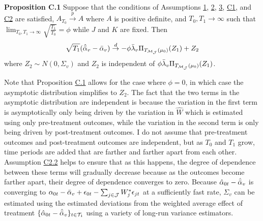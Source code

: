 \documentclass{article}
\begin{document}
\textbf{Proposition C.1} \label{PC1} Suppose that the conditions of Assumptions \hyperref[A1]{1}, \hyperref[A2]{2}, \hyperref[A3]{3}, \hyperref[AC1]{C1}, and \hyperref[AC2]{C2} are satisfied, $A_{T_0} \overset{p}{\rightarrow} A$ where $A$ is positive definite, and $T_0, T_1\rightarrow \infty$ such that $\lim_{T_0,T_1 \rightarrow \infty} \sqrt{\frac{T_1}{T_0}} = \phi$ while $J$ and $K$ are fixed. Then
\begin{equation*} 
    \sqrt{T_1}(\hat{\Bar{\alpha}}_v - \Bar{\alpha}_v) \overset{d}{\rightarrow} - \phi \Bar{\lambda}_v \Pi_{T_{\mathcal{M}_{\mathcal{J}}}(\mu_0)}(Z_1) + Z_2
\end{equation*}
where $Z_2 \sim N(0, \Sigma_v)$ and $Z_2$ is independent of $ \phi \Bar{\lambda}_v \Pi_{T_{\mathcal{M}_{\mathcal{J}}}(\mu_0)}(Z_1)$.
\par 
Note that Proposition \hyperref[PC1]{C.1} allows for the case where $\phi = 0$, in which case the asymptotic distribution simplifies to $Z_2$. The fact that the two terms in the asymptotic distribution are independent is because the variation in the first term is asymptotically only being driven by the variation in $\hat{W}$ which is estimated using only pre-treatment outcomes, while the variation in the second term is only being driven by post-treatment outcomes. I do not assume that pre-treatment outcomes and post-treatment outcomes are independent, but as $T_0$ and $T_1$ grow, time periods are added that are farther and farther apart from each other. Assumption \hyperref[AC2]{C2.2} helps to ensure that as this happens, the degree of dependence between these terms will gradually decrease because as the outcomes become farther apart, their degree of dependence converges to zero. Because $\hat{\alpha}_{0t} - \hat{\Bar{\alpha}}_v$ is converging to $\alpha_{0t} - \Bar{\alpha}_v + \epsilon_{0t} - \sum_{j \in \mathcal{J}}W^*_j \epsilon_{jt}$ at a sufficiently fast rate, $\Sigma_v$ can be estimated using the estimated deviations from the weighted average effect of treatment $\{\hat{\alpha}_{0t} - \hat{\Bar{\alpha}}_v\}_{t \in \mathcal{T}_1}$ using a variety of long-run variance estimators. 
\par
\end{document}
